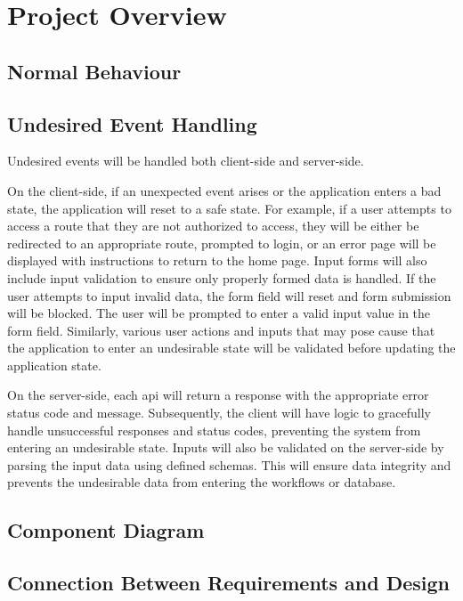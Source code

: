 \documentclass[12pt, titlepage]{article}
\begin{document}

\section{Project Overview}

\subsection{Normal Behaviour}

\subsection{Undesired Event Handling}

Undesired events will be handled both client-side and server-side.

On the client-side, if an unexpected event arises or the application enters a bad state, the
application will reset to a safe state. For example, if a user attempts to access a route that they
are not authorized to access, they will be either be redirected to an appropriate route, prompted
to login, or an error page will be displayed with instructions to return to the home page. Input
forms will also include input validation to ensure only properly formed data is handled. If the
user attempts to input invalid data, the form field will reset and form submission will be blocked.
The user will be prompted to enter a valid input value in the form field. Similarly, various user
actions and inputs that may pose cause that the application to enter an undesirable state will be
validated before updating the application state.

On the server-side, each api will return a response with the appropriate error status code and
message. Subsequently, the client will have logic to gracefully handle unsuccessful responses and
status codes, preventing the system from entering an undesirable state. Inputs will also be
validated on the server-side by parsing the input data using defined schemas. This will ensure data
integrity and prevents the undesirable data from entering the workflows or database.

\subsection{Component Diagram}

\subsection{Connection Between Requirements and Design} \label{SecConnection}
\end{document}

